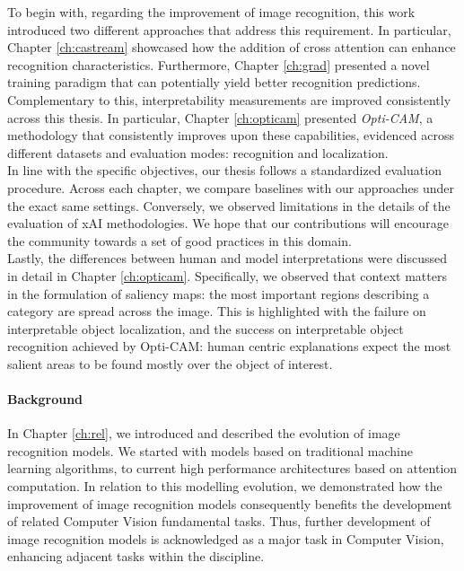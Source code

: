 \noindent To begin with, regarding the improvement of image recognition, this work 
introduced two different approaches that address this requirement. In particular, Chapter 
\ref{ch:castream} showcased how the addition of cross attention can enhance 
recognition characteristics. Furthermore, Chapter \ref{ch:grad} presented a novel training 
paradigm that can potentially yield better recognition predictions. Complementary to this, 
interpretability measurements are improved consistently across this thesis. In particular, 
Chapter \ref{ch:opticam} presented \emph{Opti-CAM}, a methodology that consistently improves 
upon these capabilities, evidenced across different datasets and evaluation modes: 
recognition and localization.\\

\noindent In line with the specific objectives, our thesis follows a standardized evaluation 
procedure. Across each chapter, we compare baselines with our approaches under the exact 
same settings. Conversely, we observed limitations in the details of the evaluation of 
xAI methodologies. We hope that our contributions will encourage the community towards a 
set of good practices in this domain.\\

\noindent Lastly, the differences between human and model interpretations were discussed in 
detail in Chapter \ref{ch:opticam}. Specifically, we observed that context matters in the 
formulation of saliency maps: the most important regions describing a category are spread across 
the image. This is highlighted with the failure on interpretable object localization, and the 
success on interpretable object recognition achieved by Opti-CAM: human centric explanations 
expect the most salient areas to be found mostly over the object of interest. \\

\paragraph{Background}
\label{sub:conc_back}
\noindent In Chapter \ref{ch:rel}, we introduced and described the evolution of image recognition 
models. We started with models based on traditional machine learning algorithms, to current high 
performance architectures based on attention computation. In relation to this modelling evolution, we 
demonstrated how the improvement of image recognition models consequently benefits the development 
of related Computer Vision fundamental tasks. Thus, further development of image recognition models 
is acknowledged as a major task in Computer Vision, enhancing adjacent tasks within the discipline.\\

